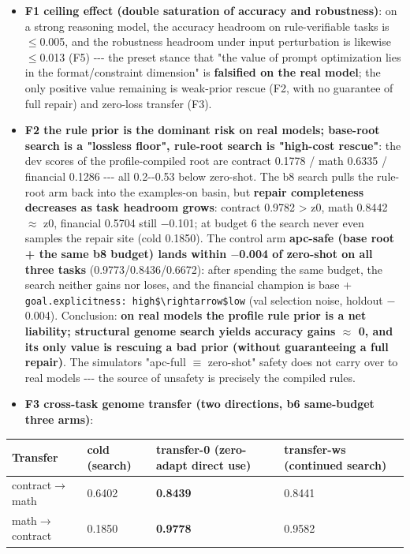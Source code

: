 \begin{itemize}
\tightlist
\item
  \textbf{F1 ceiling effect (double saturation of accuracy and robustness)}: on a strong reasoning model, the accuracy headroom on rule-verifiable tasks is \(\leq\)0.005, and the robustness headroom under input perturbation is likewise \(\leq\)0.013 (F5) -\/-\/- the preset stance that "the value of prompt optimization lies in the format/constraint dimension" is \textbf{falsified on the real model}; the only positive value remaining is weak-prior rescue (F2, with no guarantee of full repair) and zero-loss transfer (F3).
\item
  \textbf{F2 the rule prior is the dominant risk on real models; base-root search is a "lossless floor", rule-root search is "high-cost rescue"}: the dev scores of the profile-compiled root are contract 0.1778 / math 0.6335 / financial 0.1286 -\/-\/- all 0.2-\/-0.53 below zero-shot. The b8 search pulls the rule-root arm back into the examples-on basin, but \textbf{repair completeness decreases as task headroom grows}: contract 0.9782 \textgreater{} z0, math 0.8442 \(\approx\) z0, financial 0.5704 still \(-\)0.101; at budget 6 the search never even samples the repair site (cold 0.1850). The control arm \textbf{apc-safe (base root + the same b8 budget) lands within \(-\)0.004 of zero-shot on all three tasks} (0.9773/0.8436/0.6672): after spending the same budget, the search neither gains nor loses, and the financial champion is base + \texttt{goal.explicitness:\ high\$\textbackslash{}rightarrow\$low} (val selection noise, holdout \(-\)0.004). Conclusion: \textbf{on real models the profile rule prior is a net liability; structural genome search yields accuracy gains \(\approx\) 0, and its only value is rescuing a bad prior (without guaranteeing a full repair)}. The simulator\textquotesingle s "apc-full \(\equiv\) zero-shot" safety does not carry over to real models -\/-\/- the source of unsafety is precisely the compiled rules.
\item
  \textbf{F3 cross-task genome transfer (two directions, b6 same-budget three arms)}:
\end{itemize}

\begin{longtable}[]{@{}llll@{}}
\toprule\noalign{}
Transfer & cold (search) & transfer-0 (zero-adapt direct use) & transfer-ws (continued search) \\
\midrule\noalign{}
\endhead
\bottomrule\noalign{}
\endlastfoot
contract\(\rightarrow\)math & 0.6402 & \textbf{0.8439} & 0.8441 \\
math\(\rightarrow\)contract & 0.1850 & \textbf{0.9778} & 0.9582 \\
\end{longtable}

